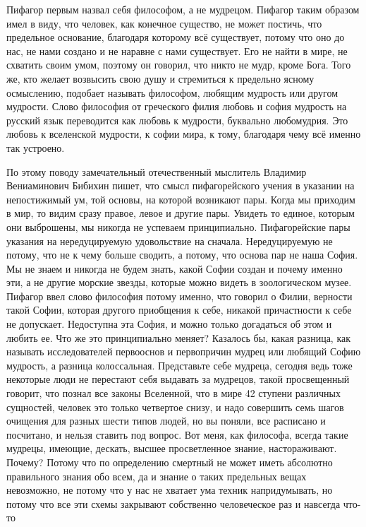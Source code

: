 Пифагор первым назвал
себя философом, а не мудрецом. Пифагор таким образом имел в виду, что человек,
как конечное существо, не может постичь, что предельное основание, благодаря
которому всё существует, потому что оно до нас, не нами создано и не наравне с
нами существует. Его не найти в мире, не схватить своим умом, поэтому он
говорил, что никто не мудр, кроме Бога. Того же, кто желает возвысить свою душу
и стремиться к предельно ясному осмыслению, подобает называть философом, любящим
мудрость или другом мудрости. Слово философия от греческого филия любовь и софия
мудрость на русский язык переводится как любовь к мудрости, буквально
любомудрия. Это любовь к вселенской мудрости, к софии мира, к тому, благодаря
чему всё именно так устроено. 

По этому поводу замечательный отечественный
мыслитель Владимир Вениаминович Бибихин пишет, что смысл пифагорейского учения в
указании на непостижимый ум, той основы, на которой возникают пары. Когда мы
приходим в мир, то видим сразу правое, левое и другие пары. Увидеть то единое,
которым они выброшены, мы никогда не успеваем принципиально. Пифагорейские пары
указания на нередуцируемую удовольствие на сначала. Нередуцируемую не потому,
что не к чему больше сводить, а потому, что основа пар не наша София. Мы не
знаем и никогда не будем знать, какой Софии создан и почему именно эти, а не
другие морские звезды, которые можно видеть в зоологическом музее. Пифагор ввел
слово философия потому именно, что говорил о Филии, верности такой Софии,
которая другого приобщения к себе, никакой причастности к себе не допускает.
Недоступна эта София, и можно только догадаться об этом и любить ее. Что же это
принципиально меняет? Казалось бы, какая разница, как называть исследователей
первооснов и первопричин мудрец или любящий Софию мудрость, а разница
колоссальная. Представьте себе мудреца, сегодня ведь тоже некоторые люди не
перестают себя выдавать за мудрецов, такой просвещенный говорит, что познал все
законы Вселенной, что в мире 42 ступени различных сущностей, человек это только
четвертое снизу, и надо совершить семь шагов очищения для разных шести типов
людей, но вы поняли, все расписано и посчитано, и нельзя ставить под вопрос. Вот
меня, как философа, всегда такие мудрецы, имеющие, дескать, высшее просветленное
знание, настораживают. Почему? Потому что по определению смертный не может иметь
абсолютно правильного знания обо всем, да и знание о таких предельных вещах
невозможно, не потому что у нас не хватает ума техник напридумывать, но потому
что все эти схемы закрывают собственно человеческое раз и навсегда что-то
